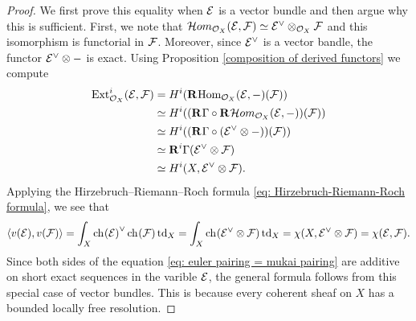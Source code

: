 \begin{proof}
    We first prove this equality when $\mathcal E$ is a vector bundle and then argue why this is sufficient. First, we note that $\localhom[X](\E, \F) \iso \E^\vee \otimes_{\struct{X}} \F$ and this isomorphism is functorial in $\mathcal F$. Moreover, since $\mathcal E^\vee$ is a vector bandle, the functor $\mathcal E^\vee \otimes -$ is exact. Using Proposition \ref{composition of derived functors} we compute
    \begin{align*}
        \Ext^i_\struct{X}(\E, \F) &= H^i(\rderived{}{\Hom_{\struct{X}}(\E, -)}(\F)) \\
        &\iso H^i((\rderived{}{\Gamma} \circ \rderived{}{\localhom[X]}(\E, -))(\F)) \\
        &\iso H^i((\rderived{}{\Gamma}\circ(\E^\vee \otimes -))(\F)) \\
        &\iso \rderived{i}{\Gamma}(\E^\vee \otimes \F) \\
        &\iso H^i(X, \E^\vee \otimes \F).
    \end{align*}    
    Applying the Hirzebruch--Riemann--Roch formula \eqref{eq: Hirzebruch-Riemann-Roch formula}, we see that 
    \[
        \pairing{v(\E)}{v(\F)} = \int_X \ch[]{\E}^\vee\ch[]{\F}\tdclass{X} = \int_X \ch[]{\E^\vee \otimes \F}\tdclass{X} = \chi(X, \E^\vee \otimes \F) = \chi(\E, \F).
    \]
    Since both sides of the equation \eqref{eq: euler pairing = mukai pairing} are additive on short exact sequences in the varible $\mathcal E$, the general formula follows from this special case of vector bundles. This is because every coherent sheaf on $X$ has a bounded locally free resolution. 
\end{proof}


